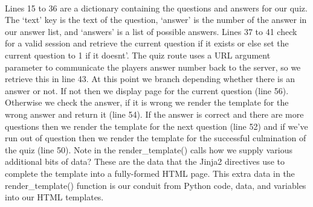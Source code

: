 \paragraph{} Lines 15 to 36 are a dictionary containing the questions and answers for our quiz. The `text' key is the text of the question, `answer' is the number of the answer in our answer list, and `answers' is a list of possible answers. Lines 37 to 41 check for a valid session and retrieve the current question if it exists or else set the current question to 1 if it doesnt'. The quiz route uses a URL argument parameter to communicate the players answer number back to the server, so we retrieve this in line 43. At this point we branch depending whether there is an answer or not. If not then we display page for the current question (line 56). Otherwise we check the answer, if it is wrong we render the template for the wrong answer and return it (line 54). If the answer is correct and there are more questions then we render the template for the next question (line 52) and if we've run out of question then we render the template for the successful culmination of the quiz (line 50). Note in the render\_template() calls how we supply various additional bits of data? These are the data that the Jinja2 directives use to complete the template into a fully-formed HTML page. This extra data in the render\_template() function is our conduit from Python code, data, and variables into our HTML templates.




